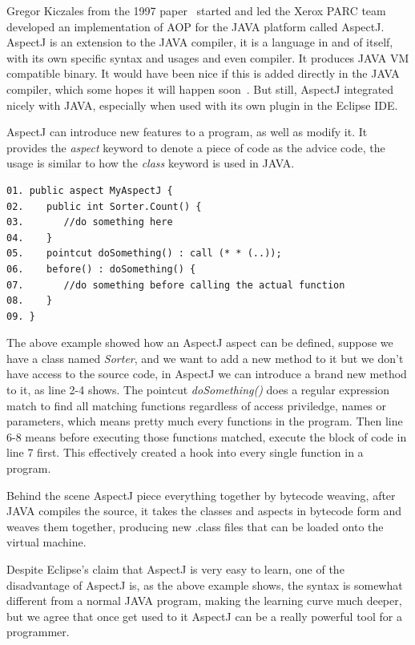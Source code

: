 Gregor Kiczales from the 1997 paper~\cite{aop} started and led the Xerox PARC team developed an implementation of AOP for the JAVA platform called AspectJ. AspectJ is an extension to the JAVA compiler, it is a language in and of itself, with its own specific syntax and usages and even compiler. It produces JAVA VM compatible binary. It would have been nice if this is added directly in the JAVA compiler, which some hopes it will happen soon~\cite{aspectj_faq}. But still, AspectJ integrated nicely with JAVA, especially when used with its own plugin in the Eclipse IDE.

AspectJ can introduce new features to a program, as well as modify it. It provides the {\em aspect} keyword to denote a piece of code as the advice code, the usage is similar to how the {\em class} keyword is used in JAVA.

\begin{verbatim}
01. public aspect MyAspectJ {
02.    public int Sorter.Count() {
03.       //do something here
04.    }
05.    pointcut doSomething() : call (* * (..));
06.    before() : doSomething() {
07.       //do something before calling the actual function
08.    }
09. }
\end{verbatim}

The above example showed how an AspectJ aspect can be defined, suppose we have a class named {\em Sorter}, and we want to add a new method to it but we don't have access to the source code, in AspectJ we can introduce a brand new method to it, as line 2-4 shows. The pointcut {\em doSomething()} does a regular expression match to find all matching functions regardless of access priviledge, names or parameters, which means pretty much every functions in the program. Then line 6-8 means before executing those functions matched, execute the block of code in line 7 first. This effectively created a hook into every single function in a program.

Behind the scene AspectJ piece everything together by bytecode weaving, after JAVA compiles the source, it takes the classes and aspects in bytecode form and weaves them together, producing new .class files that can be loaded onto the virtual machine.

Despite Eclipse's claim that AspectJ is very easy to learn, one of the disadvantage of AspectJ is, as the above example shows, the syntax is somewhat different from a normal JAVA program, making the learning curve much deeper, but we agree that once get used to it AspectJ can be a really powerful tool for a programmer.

